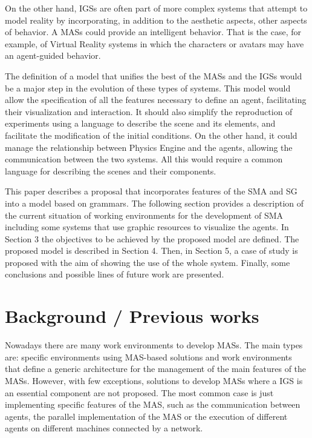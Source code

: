 \documentclass[runningheads]{llncs}
\begin{document}
On the other hand, IGSs are often part of more complex systems that attempt to model reality by incorporating, in addition to the aesthetic aspects, other aspects of behavior. A MASs could provide an intelligent behavior. That is the case, for example, of Virtual Reality systems in which the characters or avatars may have an agent-guided behavior.

The definition of a model that unifies the best of the MASs and the IGSs would be a major step in the evolution of these types of systems. This model would allow the specification of all the features necessary to define an agent, facilitating their visualization and interaction. It should also simplify the reproduction of experiments using a language to describe the scene and its elements, and facilitate the modification of the initial conditions. On the other hand, it could manage the relationship between Physics Engine and the agents, allowing the communication between the two systems. All this would require a common language for describing the scenes and their components.

This paper describes a proposal that incorporates features of the SMA and SG into a model based on grammars. The following section provides a description of the current situation of working environments for the development of SMA including some systems that use graphic resources to visualize the agents. In Section 3 the objectives to be achieved by the proposed model are defined. The proposed model is described in Section 4. Then, in Section 5, a case of study is proposed with the aim of showing the use of the whole system. Finally, some conclusions and possible lines of future work are presented.



\section{Background  /   Previous works
\label{sec:background}}

Nowadays there are many work environments to develop MASs. The main types are: specific environments using MAS-based solutions and work environments that define a generic architecture for the management of the main features of the MASs. However, with few exceptions, solutions to develop MASs where a IGS is an essential component are not proposed. The most common case is just implementing specific features of the MAS, such as the communication between agents, the parallel implementation of the MAS or the execution of different agents on different machines connected by a network.
\end{document}
